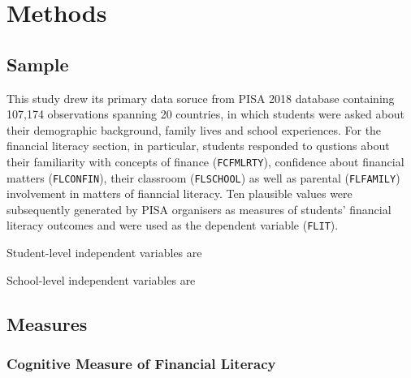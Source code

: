 \documentclass[a4paper,11pt,UKenglish,twoside,openright]{report}\usepackage[]{graphicx}\usepackage[]{color}
\begin{document}
\newpage



\newpage



\newpage



\newpage




\chapter{Methods}
\label{chp:3}

\section{Sample}

This study drew its primary data soruce from PISA 2018 database \parencite{FLdata} containing 107,174 observations spanning 20 countries, in which students were asked about their demographic background, family lives and school experiences. For the financial literacy section, in particular, students responded to qustions about their familiarity with concepts of finance (\texttt{FCFMLRTY}), confidence about financial matters (\texttt{FLCONFIN}), their classroom (\texttt{FLSCHOOL}) as well as parental (\texttt{FLFAMILY}) involvement in matters of fianncial literacy. Ten plausible values were subsequently generated by PISA organisers as measures of students' financial literacy outcomes and were used as the dependent variable (\texttt{FLIT}).

Student-level independent variables are

School-level independent variables are

\section{Measures}

\subsection{Cognitive Measure of Financial Literacy}
\end{document}
